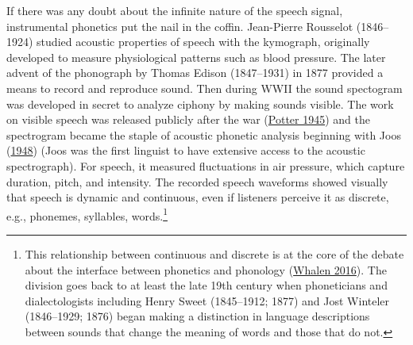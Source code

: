 \documentclass[
]{article}
\begin{document}
If there was any doubt about the infinite nature of the speech signal,
instrumental phonetics put the nail in the coffin. Jean-Pierre Rousselot
(1846--1924) studied acoustic properties of speech with the kymograph,
originally developed to measure physiological patterns such as blood
pressure. The later advent of the phonograph by Thomas Edison
(1847--1931) in 1877 provided a means to record and reproduce sound.
Then during WWII the sound spectogram was developed in secret to analyze
ciphony by making sounds visible. The work on visible speech was
released publicly after the war
(\protect\hyperlink{ref-Potter1945}{Potter 1945}) and the spectrogram
became the staple of acoustic phonetic analysis beginning with Joos
(\protect\hyperlink{ref-Joos1948}{1948}) (Joos was the first linguist to
have extensive access to the acoustic spectrograph). For speech, it
measured fluctuations in air pressure, which capture duration, pitch,
and intensity. The recorded speech waveforms showed visually that speech
is dynamic and continuous, even if listeners perceive it as discrete,
e.g., phonemes, syllables, words.\footnote{This relationship between
  continuous and discrete is at the core of the debate about the
  interface between phonetics and phonology
  (\protect\hyperlink{ref-Whalen2019}{Whalen 2016}). The division goes
  back to at least the late 19th century when phoneticians and
  dialectologists including Henry Sweet (1845--1912; 1877) and Jost
  Winteler (1846--1929; 1876) began making a distinction in language
  descriptions between sounds that change the meaning of words and those
  that do not.}
\end{document}
